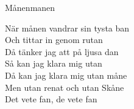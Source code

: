 \begin{song}{Månen}{manen}
\begin{vers}
När månen vandrar sin tysta ban\\
Och tittar in genom rutan\\
Då tänker jag att på ljusa dan\\
Så kan jag klara mig utan\\
Då kan jag klara mig utan måne\\
Men utan renat och utan Skåne\\
Det vete fan, de vete fan\\
\end{vers}
\end{song}
